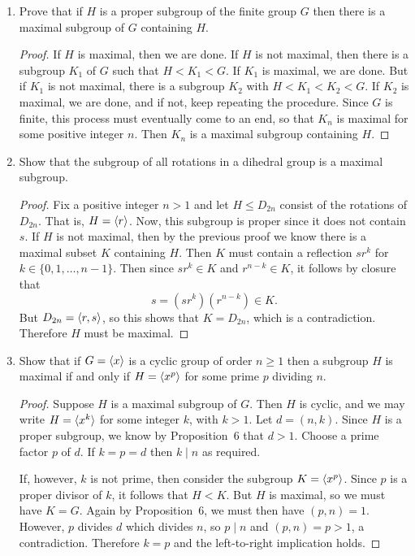 \begin{enumerate}
\item Prove that if $H$ is a proper subgroup of the finite group $G$
  then there is a maximal subgroup of $G$ containing $H$.
  \begin{proof}
    If $H$ is maximal, then we are done. If $H$ is not maximal, then
    there is a subgroup $K_1$ of $G$ such that $H<K_1<G$. If $K_1$ is
    maximal, we are done. But if $K_1$ is not maximal, there is a
    subgroup $K_2$ with $H<K_1<K_2<G$. If $K_2$ is maximal, we are
    done, and if not, keep repeating the procedure. Since $G$ is
    finite, this process must eventually come to an end, so that $K_n$
    is maximal for some positive integer $n$. Then $K_n$ is a maximal
    subgroup containing $H$.
  \end{proof}
\item Show that the subgroup of all rotations in a dihedral group is a
  maximal subgroup.
  \begin{proof}
    Fix a positive integer $n>1$ and let $H\leq D_{2n}$ consist of the
    rotations of $D_{2n}$. That is, $H = \langle{r}\rangle$. Now, this subgroup
    is proper since it does not contain $s$. If $H$ is not maximal,
    then by the previous proof we know there is a maximal subset $K$
    containing $H$. Then $K$ must contain a reflection $sr^k$ for
    $k\in\{0,1,\dots,n-1\}$. Then since $sr^k\in K$ and
    $r^{n-k}\in K$, it follows by closure that
    \begin{equation*}
      s = (sr^k)(r^{n-k})\in K.
    \end{equation*}
    But $D_{2n} = \langle{r,s}\rangle$, so this shows that $K = D_{2n}$, which
    is a contradiction. Therefore $H$ must be maximal.
  \end{proof}
\item Show that if $G = \langle{x}\rangle$ is a cyclic group of order $n\geq1$
  then a subgroup $H$ is maximal if and only if $H = \langle{x^p}\rangle$ for
  some prime $p$ dividing $n$.
  \begin{proof}
    Suppose $H$ is a maximal subgroup of $G$. Then $H$ is cyclic, and
    we may write $H = \langle{x^k}\rangle$ for some integer $k$, with $k >
    1$. Let $d = (n,k)$. Since $H$ is a proper subgroup, we know by
    Proposition~6 that $d > 1$. Choose a prime factor $p$ of $d$. If
    $k = p = d$ then $k\mid n$ as required.

    If, however, $k$ is not prime, then consider the subgroup
    $K = \langle{x^p}\rangle$. Since $p$ is a proper divisor of $k$, it follows
    that $H<K$. But $H$ is maximal, so we must have $K = G$. Again by
    Proposition~6, we must then have $(p,n) = 1$. However, $p$ divides
    $d$ which divides $n$, so $p\mid n$ and $(p,n) = p > 1$, a
    contradiction. Therefore $k = p$ and the left-to-right implication
    holds.


\end{proof}
\end{enumerate}
